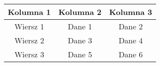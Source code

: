 \documentclass{article}
\begin{document}
\begin{tabular}{|c|c|c|}
  \hline
  \textbf{Kolumna 1} & \textbf{Kolumna 2} & \textbf{Kolumna 3} \\
  \hline
  Wiersz 1 & Dane 1 & Dane 2 \\
  \hline
  Wiersz 2 & Dane 3 & Dane 4 \\
  \hline
  Wiersz 3 & Dane 5 & Dane 6 \\
  \hline
\end{tabular}
\end{document}
